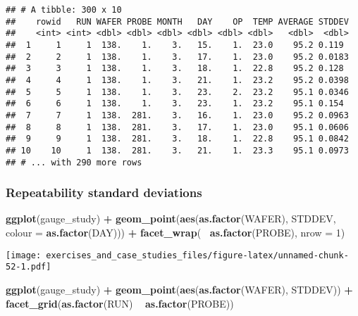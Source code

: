 \documentclass[]{book}
\newenvironment{Shaded}{\begin{snugshade}}{\end{snugshade}}
\newcommand{\DataTypeTok}[1]{\textcolor[rgb]{0.13,0.29,0.53}{#1}}
\newcommand{\DecValTok}[1]{\textcolor[rgb]{0.00,0.00,0.81}{#1}}
\newcommand{\KeywordTok}[1]{\textcolor[rgb]{0.13,0.29,0.53}{\textbf{#1}}}
\newcommand{\NormalTok}[1]{#1}
\newcommand{\OperatorTok}[1]{\textcolor[rgb]{0.81,0.36,0.00}{\textbf{#1}}}
\newcommand{\StringTok}[1]{\textcolor[rgb]{0.31,0.60,0.02}{#1}}
\theoremstyle{definition}
\theoremstyle{definition}
\theoremstyle{definition}
\theoremstyle{remark}
\begin{document}
\begin{verbatim}
## # A tibble: 300 x 10
##    rowid   RUN WAFER PROBE MONTH   DAY    OP  TEMP AVERAGE STDDEV
##    <int> <int> <dbl> <dbl> <dbl> <dbl> <dbl> <dbl>   <dbl>  <dbl>
##  1     1     1  138.    1.    3.   15.    1.  23.0    95.2 0.119 
##  2     2     1  138.    1.    3.   17.    1.  23.0    95.2 0.0183
##  3     3     1  138.    1.    3.   18.    1.  22.8    95.2 0.128 
##  4     4     1  138.    1.    3.   21.    1.  23.2    95.2 0.0398
##  5     5     1  138.    1.    3.   23.    2.  23.2    95.1 0.0346
##  6     6     1  138.    1.    3.   23.    1.  23.2    95.1 0.154 
##  7     7     1  138.  281.    3.   16.    1.  23.0    95.2 0.0963
##  8     8     1  138.  281.    3.   17.    1.  23.0    95.1 0.0606
##  9     9     1  138.  281.    3.   18.    1.  22.8    95.1 0.0842
## 10    10     1  138.  281.    3.   21.    1.  23.3    95.1 0.0973
## # ... with 290 more rows
\end{verbatim}

\hypertarget{repeatability-standard-deviations}{%
\subsubsection{Repeatability standard
deviations}\label{repeatability-standard-deviations}}

\begin{Shaded}
\begin{Highlighting}[]
\KeywordTok{ggplot}\NormalTok{(gauge_study) }\OperatorTok{+}
\StringTok{  }\KeywordTok{geom_point}\NormalTok{(}\KeywordTok{aes}\NormalTok{(}\KeywordTok{as.factor}\NormalTok{(WAFER), STDDEV, }\DataTypeTok{colour =} \KeywordTok{as.factor}\NormalTok{(DAY))) }\OperatorTok{+}
\StringTok{  }\KeywordTok{facet_wrap}\NormalTok{(}\OperatorTok{~}\StringTok{ }\KeywordTok{as.factor}\NormalTok{(PROBE), }\DataTypeTok{nrow =} \DecValTok{1}\NormalTok{)}
\end{Highlighting}
\end{Shaded}

\texttt{[image: exercises\_and\_case\_studies\_files/figure-latex/unnamed-chunk-52-1.pdf]}

\begin{Shaded}
\begin{Highlighting}[]
\KeywordTok{ggplot}\NormalTok{(gauge_study) }\OperatorTok{+}
\StringTok{  }\KeywordTok{geom_point}\NormalTok{(}\KeywordTok{aes}\NormalTok{(}\KeywordTok{as.factor}\NormalTok{(WAFER), STDDEV)) }\OperatorTok{+}
\StringTok{  }\KeywordTok{facet_grid}\NormalTok{(}\KeywordTok{as.factor}\NormalTok{(RUN) }\OperatorTok{~}\StringTok{ }\KeywordTok{as.factor}\NormalTok{(PROBE))}
\end{Highlighting}
\end{Shaded}
\end{document}

